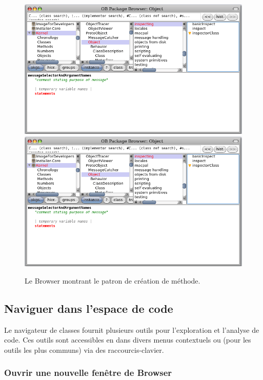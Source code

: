 \documentclass[a4paper,10pt,twoside]{book}
\begin{document}
\begin{figure}[htbp]
   \centering
   \ifluluelse
	   {\includegraphics [width=\textwidth]{SystemBrowserMethodTemplate}}
	   {\includegraphics[width=.7\textwidth]{SystemBrowserMethodTemplate}}
   \caption{Le Browser montrant le patron de création de méthode.
   }
\end{figure}

\subsection{Naviguer dans l'espace de code} %

Le navigateur de classes fournit plusieurs outils pour l'exploration et 
l'analyse de code. 
Ces outils sont accessibles en \actclickant dans divers menus
contextuels ou (pour les outils les plus communs) via des
raccourcis-clavier.

\subsubsection{Ouvrir une nouvelle fenêtre de Browser}
\end{document}
